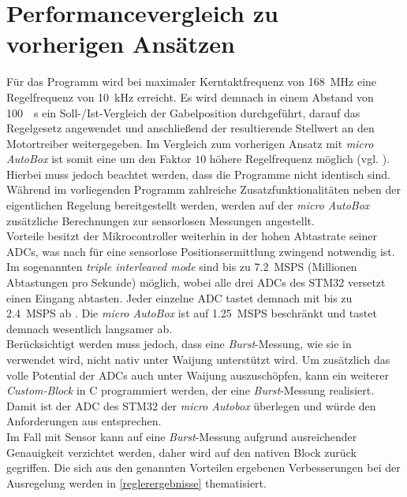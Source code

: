\section{Performancevergleich zu vorherigen Ansätzen} \label{perfVergl}
Für das Programm wird bei maximaler Kerntaktfrequenz von \SI{168}{MHz} eine Regelfrequenz von \SI{10}{kHz} erreicht. Es wird demnach in einem Abstand von \SI{100}{\mu s} ein Soll-/Ist-Vergleich der Gabelposition durchgeführt, darauf das Regelgesetz angewendet und anschließend der resultierende Stellwert an den Motortreiber weitergegeben. Im Vergleich zum vorherigen Ansatz mit \textit{micro AutoBox} ist somit eine um den Faktor $10$ höhere Regelfrequenz möglich (vgl. \cite{vADP}). Hierbei muss jedoch beachtet werden, dass die Programme nicht identisch sind. Während im vorliegenden Programm zahlreiche Zusatzfunktionalitäten neben der eigentlichen Regelung bereitgestellt werden, werden auf der \textit{micro AutoBox} zusätzliche Berechnungen zur sensorlosen Messungen angestellt. \\
Vorteile besitzt der Mikrocontroller weiterhin in der hohen Abtastrate seiner ADCs, was nach \cite{vADP} für eine sensorlose Positionsermittlung zwingend notwendig ist. Im sogenannten \textit{triple interleaved mode} sind bis zu \SI{7,2}{MSPS} (Millionen Abtastungen pro Sekunde) möglich, wobei alle drei ADCs des STM32 versetzt einen Eingang abtasten. Jeder einzelne ADC tastet demnach mit bis zu \SI{2,4}{MSPS} ab \cite{stm32}. Die \textit{micro AutoBox} ist auf \SI{1,25}{MSPS} beschränkt und tastet demnach wesentlich langsamer ab. \\
Berücksichtigt werden muss jedoch, dass eine \textit{Burst}-Messung, wie sie in \cite{vADP} verwendet wird, nicht nativ unter Waijung  unterstützt wird. Um zusätzlich das volle Potential der ADCs auch unter Waijung auszuschöpfen, kann ein weiterer \textit{Custom-Block} in C programmiert werden, der eine \textit{Burst}-Messung realisiert. Damit ist der ADC des STM32 der \textit{micro Autobox} überlegen und würde den Anforderungen aus \cite{vADP} entsprechen.  \\
Im Fall mit Sensor kann auf eine \textit{Burst}-Messung aufgrund ausreichender Genauigkeit verzichtet werden, daher wird auf den nativen Block zurück gegriffen. Die sich aus den genannten Vorteilen ergebenen Verbesserungen bei der Ausregelung werden in \autoref{reglerergebnisse} thematisiert.

